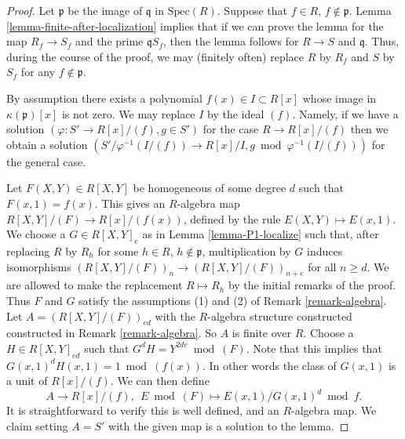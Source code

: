 \begin{proof}
Let $\mathfrak p$ be the image of $\mathfrak q$ in $\text{Spec}(R)$.
Suppose that $f \in R$, $f \not \in \mathfrak p$.
Lemma \ref{lemma-finite-after-localization} implies that if
we can prove the lemma for the map
$R_f \to S_f$ and the prime $\mathfrak qS_f$, then
the lemma follows for $R \to S$ and $\mathfrak q$.
Thus, during the course of the proof, we may (finitely often)
replace $R$ by $R_f$ and $S$ by $S_f$ for any
$f \not \in \mathfrak p$.

\medskip\noindent
By assumption there exists a polynomial $f(x) \in I \subset R[x]$
whose image in $\kappa(\mathfrak p)[x]$ is not zero. We may
replace $I$ by the ideal $(f)$. Namely, if we have a solution
$(\varphi : S' \to R[x]/(f), g \in S')$ for the case $R \to R[x]/(f)$
then we obtain a solution
$(S'/\varphi^{-1}(I/(f)) \to R[x]/I, g \bmod \varphi^{-1}(I/(f)))$
for the general case.

\medskip\noindent
Let $F(X, Y) \in R[X, Y]$ be homogeneous of some degree $d$ such that
$F(x, 1) = f(x)$. This gives an $R$-algebra map $R[X, Y]/(F) \to R[x]/(f(x))$,
defined by the rule $E(X, Y) \mapsto E(x, 1)$.
We choose a $G \in R[X, Y]_e$ as in Lemma \ref{lemma-P1-localize}
such that, after replacing $R$ by $R_h$ for some $h \in R$,
$h \not \in \mathfrak p$, multiplication by $G$ induces isomorphisms
$(R[X, Y]/(F))_n \to (R[X, Y]/(F))_{n + e}$ for
all $n \geq d$. We are allowed to make the replacement
$R \mapsto R_h$ by the initial remarks of the proof.
Thus $F$ and $G$ satisfy the assumptions (1) and (2) of Remark
\ref{remark-algebra}. Let $A = (R[X, Y]/(F))_{ed}$
with the $R$-algebra structure constructed
constructed in Remark \ref{remark-algebra}. So $A$ is finite over $R$.
Choose a $H \in R[X, Y]_{ed}$ such that $G^d H = Y^{2de} \bmod (F)$.
Note that this implies that $G(x, 1)^dH(x, 1) = 1 \bmod (f(x))$.
In other words the class of $G(x, 1)$ is a unit of $R[x]/(f)$.
We can then define
$$
A \longrightarrow R[x]/(f), \ \ 
E \bmod (F) \longmapsto E(x, 1)/G(x, 1)^d \bmod f.
$$
It is straightforward to verify this is well defined, and an
$R$-algebra map. We claim setting $A = S'$ with the given map
is a solution to the lemma.


\end{proof}
